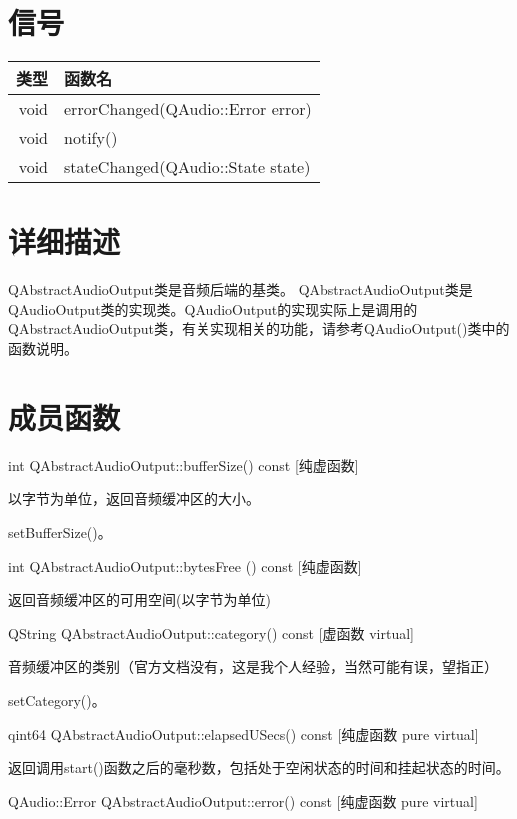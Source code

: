 \section{信号}

\begin{tabular}{|r|l|}
\hline
类型&函数名\\
\hline
void&	errorChanged(QAudio::Error error)\\
\hline
void&	notify()\\
\hline
void&	stateChanged(QAudio::State state)\\
\hline
\end{tabular}

\section{详细描述}

QAbstractAudioOutput类是音频后端的基类。 QAbstractAudioOutput类是
QAudioOutput类的实现类。QAudioOutput的实现实际上是调用的
QAbstractAudioOutput类，有关实现相关的功能，请参考QAudioOutput()类中的
函数说明。

\section{成员函数}

int QAbstractAudioOutput::bufferSize() const [纯虚函数] 

以字节为单位，返回音频缓冲区的大小。


\begin{seeAlso}
setBufferSize()。
\end{seeAlso}

int QAbstractAudioOutput::bytesFree () const [纯虚函数] 

返回音频缓冲区的可用空间(以字节为单位)

QString QAbstractAudioOutput::category() const [虚函数 virtual] 

音频缓冲区的类别（官方文档没有，这是我个人经验，当然可能有误，望指正） 

\begin{seeAlso}
setCategory()。
\end{seeAlso}

qint64 QAbstractAudioOutput::elapsedUSecs() const [纯虚函数 pure virtual] 

返回调用start()函数之后的毫秒数，包括处于空闲状态的时间和挂起状态的时间。

QAudio::Error QAbstractAudioOutput::error() const [纯虚函数 pure
virtual] 

